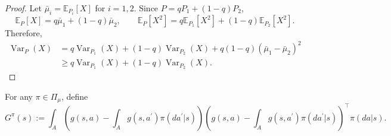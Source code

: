 \documentclass{amsart}
\theoremstyle{definition}
\begin{document}
\begin{proof}
Let $\bar{\mu}_i=\mathbb E_{P_i}[X]$ for $i=1,2$. Since
$P=qP_1+(1-q)P_2$,
\[
\mathbb E_P[X]=q\bar{\mu}_1+(1-q)\bar{\mu}_2,
\qquad
\mathbb E_P[X^2]
=
q\mathbb E_{P_1}[X^2]+(1-q)\mathbb E_{P_2}[X^2].
\]
Therefore,
\[
\begin{aligned}
\operatorname{Var}_P(X)
&=
q\operatorname{Var}_{P_1}(X)
+
(1-q)\operatorname{Var}_{P_2}(X)
+
q(1-q)(\bar{\mu}_1-\bar{\mu}_2)^2 \\
&\ge
q\operatorname{Var}_{P_1}(X)
+
(1-q)\operatorname{Var}_{P_2}(X).
\end{aligned}
\]
\end{proof}

For any $\pi \in \Pi_\mu$, define
\[
G^{\pi}(s) := \int_A \left(g(s,a) - \int_A g(s, a^\prime) \pi ( da^\prime | s) \right)\left(g(s,a) - \int_A g(s, a^\prime) \pi (da^\prime | s) \right)^{\top}\pi(da|s).
\]
\end{document}
